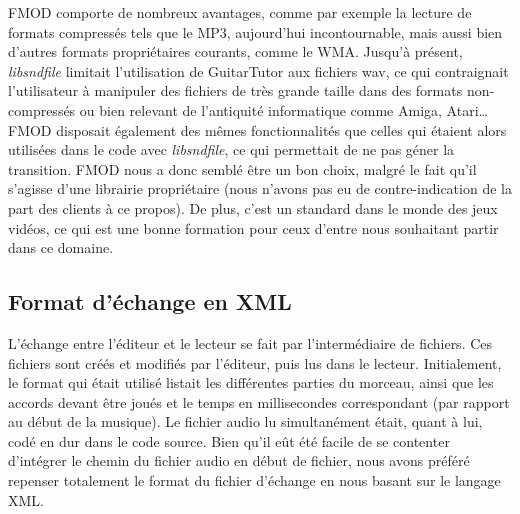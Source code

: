 FMOD comporte de nombreux avantages, comme par exemple la lecture de formats compressés tels que le MP3, aujourd'hui incontournable, mais aussi bien d'autres formats propriétaires courants, comme le WMA.
Jusqu'à présent, \textit{libsndfile} limitait l'utilisation de GuitarTutor aux fichiers wav, ce qui contraignait l'utilisateur à manipuler des fichiers de très grande taille dans des formats non-compressés ou bien relevant de l'antiquité informatique comme Amiga, Atari\dots FMOD disposait également des mêmes fonctionnalités que celles qui étaient alors utilisées dans le code avec \textit{libsndfile}, ce qui permettait de ne pas géner la transition. FMOD nous a donc semblé être un bon choix, malgré le fait qu'il s'agisse d'une librairie propriétaire (nous n'avons pas eu de contre-indication de la part des clients à ce propos).
De plus, c'est un standard dans le monde des jeux vidéos, ce qui est une bonne formation pour ceux d'entre nous souhaitant partir dans ce domaine.


\subsection{Format d'échange en XML}
\label{xml}

L'échange entre l'éditeur et le lecteur se fait par l'intermédiaire de fichiers. Ces fichiers sont créés et modifiés par l'éditeur, puis lus dans le lecteur. Initialement, le format qui était utilisé listait les différentes parties du morceau, ainsi que les accords devant être joués et le temps en millisecondes correspondant (par rapport au début de la musique). Le fichier audio lu simultanément était, quant à lui, codé en dur dans le code source. Bien qu'il eût été facile de se contenter d'intégrer le chemin du fichier audio en début de fichier, nous avons préféré repenser totalement le format du fichier d'échange en nous basant sur le langage XML.


